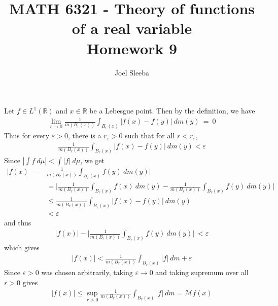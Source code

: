 \documentclass[12pt]{exam}
\theoremstyle{plain} %
\theoremstyle{definition} %
\theoremstyle{remark} %
\begin{document}
\title{MATH 6321 - Theory of functions of a real variable \\ Homework 9}

\author{
  Joel Sleeba \\
}

\maketitle
\printanswers
\unframedsolutions

\begin{questions}
  \question
  \begin{solution}
    Let $f \in L^{1}(\mathbb{R})$ and $x \in \mathbb{R}$ be a
    Lebesgue point. Then by the definition, we have
    \begin{align*}
      \lim_{r \to 0} \frac{1}{m(B_r(x))} \int_{B_r(x)} |f(x) - f(y)|
      \ d m( y) \ = \ 0
    \end{align*}
    Thus for every $\varepsilon > 0$, there is a $r_\varepsilon >0$
    such that for all $r < r_\varepsilon$,
    \begin{align*}
      \frac{1}{m(B_r(x))} \int_{B_r(x)} |f(x) - f(y)|
      \ d m( y) < \varepsilon
    \end{align*}
    Since $|\int f \ d \mu| < \int |f| \ d \mu$, we get
    \begin{align*}
      \Big|f(x) \ - \ &\frac{1}{m(B_r(x))} \int_{B_r(x)} f(y) \ d m(y)
      \Big| \\
      &= \Big|\frac{1}{m(B_r(x))} \int_{B_r(x)} f(x) \ d m(y) -
      \frac{1}{m(B_r(x))} \int_{B_r(x)} f(y) \ d m(y)\Big| \\
      &\le \frac{1}{m(B_r(x))} \int_{B_r(x)} |f(x) - f(y)| \ d m( y) \\
      &< \varepsilon
    \end{align*}
    and thus
    \begin{align*}
      |f(x)| - \Big|\frac{1}{m(B_r(x))}
      \int_{B_r(x)} f(y) \ d m(y) \Big|  \ < \varepsilon
    \end{align*}
    which gives
    \begin{align*}
      |f(x)| < \frac{1}{m(B_r(x))}
      \int_{B_r(x)} |f| \ d m + \varepsilon
    \end{align*}
    Since $\varepsilon >0$ was chosen arbitrarily, taking
    $\varepsilon \to 0$ and taking supremum over all $r > 0$ gives
    \begin{align*}
      |f(x)| \le \sup_{r > 0}\frac{1}{m(B_r(x))}
      \int_{B_r(x)} |f| \ d m = \mathcal{M}f(x)
    \end{align*}
  \end{solution}


\end{questions}
\end{document}
